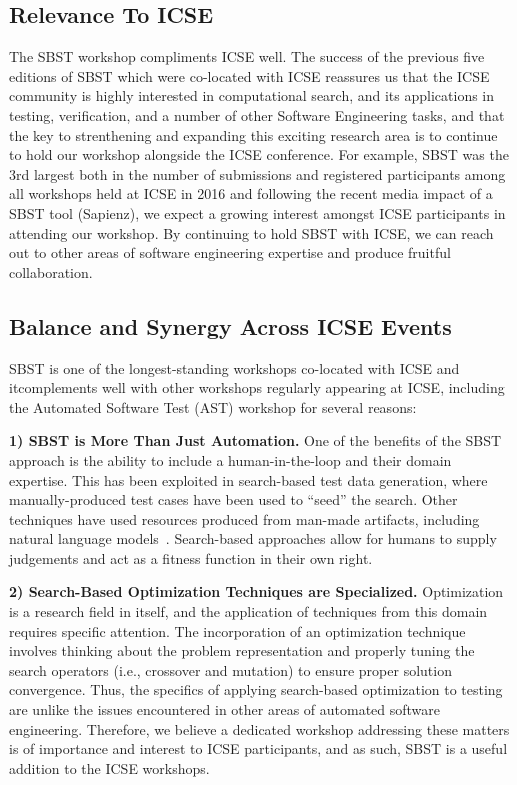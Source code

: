 \documentclass[sigconf,review]{acmart}
\begin{document}
\subsection{Relevance To ICSE}
\label{sec:relevance-icse}

The SBST workshop compliments ICSE well. The success of the previous
five editions of SBST which were co-located with ICSE reassures us
that the ICSE community is highly interested in computational search,
and its applications in testing, verification, and a number of other
Software Engineering tasks, and that the key to strenthening and
expanding this exciting research area is to continue to hold our
workshop alongside the ICSE conference. For example, SBST was the 3rd
largest both in the number of submissions and registered participants
among all workshops held at ICSE in 2016 and following the recent
media impact of a SBST tool (Sapienz), we expect a growing interest
amongst ICSE participants in attending our workshop.  By continuing to
hold SBST with ICSE, we can reach out to other areas of software
engineering expertise and produce fruitful collaboration.


\subsection{Balance and Synergy Across ICSE Events}
\label{sec:balance-icse}

SBST is one of the longest-standing workshops co-located with ICSE and
itcomplements well with other workshops regularly appearing at ICSE,
including the Automated Software Test (AST) workshop for several
reasons:

{\bf 1) SBST is More Than Just Automation.}  One of the benefits of
the SBST approach is the ability to include a human-in-the-loop and
their domain expertise.  This has been exploited in search-based test
data generation, where manually-produced test cases have been used to
``seed'' the search.  Other techniques have used resources produced
from man-made artifacts, including natural language
models~\cite{Afshan2013}.  Search-based approaches allow for humans to
supply judgements and act as a fitness function in their own
right. %

{\bf 2) Search-Based Optimization Techniques are Specialized.}
Optimization is a research field in itself, and the application of
techniques from this domain requires specific attention.  The
incorporation of an optimization technique involves thinking about the
problem representation and properly tuning the search operators (i.e.,
crossover and mutation) to ensure proper solution convergence.  Thus,
the specifics of applying search-based optimization to testing are
unlike the issues encountered in other areas of automated software
engineering. Therefore, we believe a dedicated workshop addressing
these matters is of importance and interest to ICSE participants, and
as such, SBST is a useful addition to the ICSE workshops.
\end{document}
